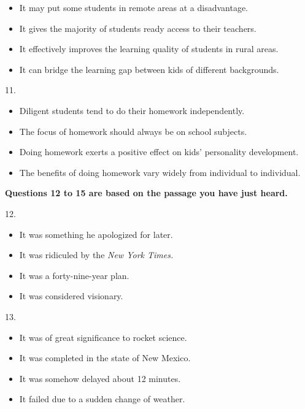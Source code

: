\documentclass[UTF8,11pt]{ctexart}
\begin{document}
\begin{itemize}[leftmargin=2em,itemsep=.2em,topsep=.4em]\item[A.] It may put some students in remote areas at a disadvantage.
\item[B.] It gives the majority of students ready access to their teachers.
\item[C.] It effectively improves the learning quality of students in rural areas.
\item[D.] It can bridge the learning gap between kids of different backgrounds.
\end{itemize}

11.


\begin{itemize}[leftmargin=2em,itemsep=.2em,topsep=.4em]\item[A.] Diligent students tend to do their homework independently.
\item[B.] The focus of homework should always be on school subjects.
\item[C.] Doing homework exerts a positive effect on kids' personality development.
\item[D.] The benefits of doing homework vary widely from individual to individual.
\end{itemize}

\textbf{Questions 12 to 15 are based on the passage you have just heard.}


12.


\begin{itemize}[leftmargin=2em,itemsep=.2em,topsep=.4em]\item[A.] It was something he apologized for later.
\item[B.] It was ridiculed by the \textit{New York Times.}
\item[C.] It was a forty-nine-year plan.
\item[D.] It was considered visionary.
\end{itemize}

13.


\begin{itemize}[leftmargin=2em,itemsep=.2em,topsep=.4em]\item[A.] It was of great significance to rocket science.
\item[B.] It was completed in the state of New Mexico.
\item[C.] It was somehow delayed about 12 minutes.
\item[D.] It failed due to a sudden change of weather.
\end{itemize}
\end{document}
